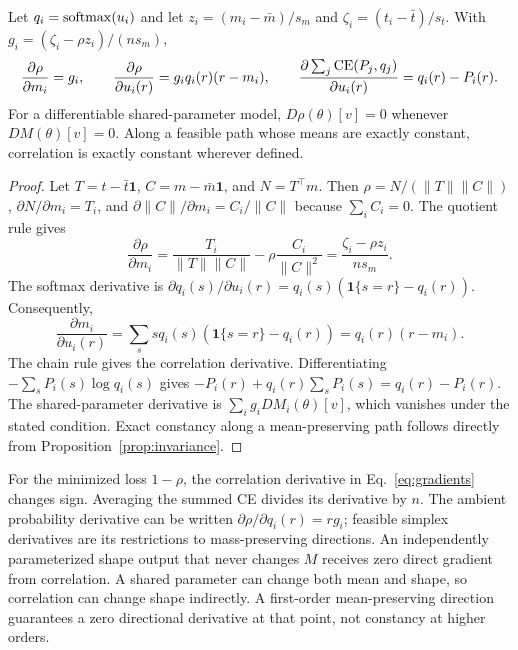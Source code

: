 \begin{proposition}\label{prop:gradient}
Let $q_i=\operatorname{softmax}(u_i)$ and let $z_i=(m_i-\bar m)/s_m$ and $\zeta_i=(t_i-\bar t)/s_t$.
With $g_i=(\zeta_i-\rho z_i)/(n s_m)$,
\begin{equation}\label{eq:gradients}
 \frac{\partial\rho}{\partial m_i}=g_i,\qquad
 \frac{\partial\rho}{\partial u_i(r)}=g_i q_i(r)(r-m_i),\qquad
 \frac{\partial\sum_j\operatorname{CE}(P_j,q_j)}{\partial u_i(r)}=q_i(r)-P_i(r).
\end{equation}
For a differentiable shared-parameter model, $D\rho(\theta)[v]=0$ whenever $DM(\theta)[v]=0$.
Along a feasible path whose means are exactly constant, correlation is exactly constant wherever defined.
\end{proposition}
\begin{proof}
Let $T=t-\bar t\mathbf1$, $C=m-\bar m\mathbf1$, and $N=T^\top m$.
Then $\rho=N/(\|T\|\|C\|)$, $\partial N/\partial m_i=T_i$, and $\partial\|C\|/\partial m_i=C_i/\|C\|$ because $\sum_i C_i=0$.
The quotient rule gives
\[
 \frac{\partial\rho}{\partial m_i}=\frac{T_i}{\|T\|\|C\|}-\rho\frac{C_i}{\|C\|^2}=\frac{\zeta_i-\rho z_i}{n s_m}.
\]
The softmax derivative is $\partial q_i(s)/\partial u_i(r)=q_i(s)(\mathbf1\{s=r\}-q_i(r))$.
Consequently,
\[
 \frac{\partial m_i}{\partial u_i(r)}=\sum_s s q_i(s)(\mathbf1\{s=r\}-q_i(r))=q_i(r)(r-m_i).
\]
The chain rule gives the correlation derivative.
Differentiating $-\sum_sP_i(s)\log q_i(s)$ gives $-P_i(r)+q_i(r)\sum_sP_i(s)=q_i(r)-P_i(r)$.
The shared-parameter derivative is $\sum_i g_i DM_i(\theta)[v]$, which vanishes under the stated condition.
Exact constancy along a mean-preserving path follows directly from Proposition~\ref{prop:invariance}.
\end{proof}

For the minimized loss $1-\rho$, the correlation derivative in Eq.~\eqref{eq:gradients} changes sign.
Averaging the summed CE divides its derivative by $n$.
The ambient probability derivative can be written $\partial\rho/\partial q_i(r)=r g_i$; feasible simplex derivatives are its restrictions to mass-preserving directions.
An independently parameterized shape output that never changes $M$ receives zero direct gradient from correlation.
A shared parameter can change both mean and shape, so correlation can change shape indirectly.
A first-order mean-preserving direction guarantees a zero directional derivative at that point, not constancy at higher orders.

